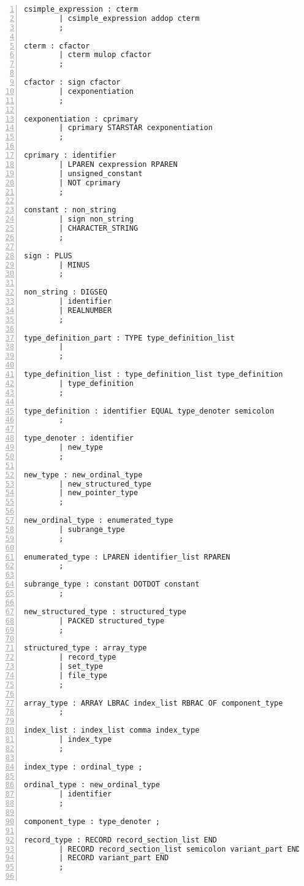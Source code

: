 \begin{Verbatim}[numbers=left]
csimple_expression : cterm
        | csimple_expression addop cterm
        ;

cterm : cfactor
        | cterm mulop cfactor
        ;

cfactor : sign cfactor
        | cexponentiation
        ;

cexponentiation : cprimary
        | cprimary STARSTAR cexponentiation
        ;

cprimary : identifier
        | LPAREN cexpression RPAREN
        | unsigned_constant
        | NOT cprimary
        ;

constant : non_string
        | sign non_string
        | CHARACTER_STRING
        ;

sign : PLUS
        | MINUS
        ;

non_string : DIGSEQ
        | identifier
        | REALNUMBER
        ;

type_definition_part : TYPE type_definition_list
        |
        ;

type_definition_list : type_definition_list type_definition
        | type_definition
        ;

type_definition : identifier EQUAL type_denoter semicolon
        ;

type_denoter : identifier
        | new_type
        ;

new_type : new_ordinal_type
        | new_structured_type
        | new_pointer_type
        ;

new_ordinal_type : enumerated_type
        | subrange_type
        ;

enumerated_type : LPAREN identifier_list RPAREN
        ;

subrange_type : constant DOTDOT constant
        ;

new_structured_type : structured_type
        | PACKED structured_type
        ;

structured_type : array_type
        | record_type
        | set_type
        | file_type
        ;

array_type : ARRAY LBRAC index_list RBRAC OF component_type
        ;

index_list : index_list comma index_type
        | index_type
        ;

index_type : ordinal_type ;

ordinal_type : new_ordinal_type
        | identifier
        ;

component_type : type_denoter ;

record_type : RECORD record_section_list END
        | RECORD record_section_list semicolon variant_part END
        | RECORD variant_part END
        ;


\end{Verbatim}
